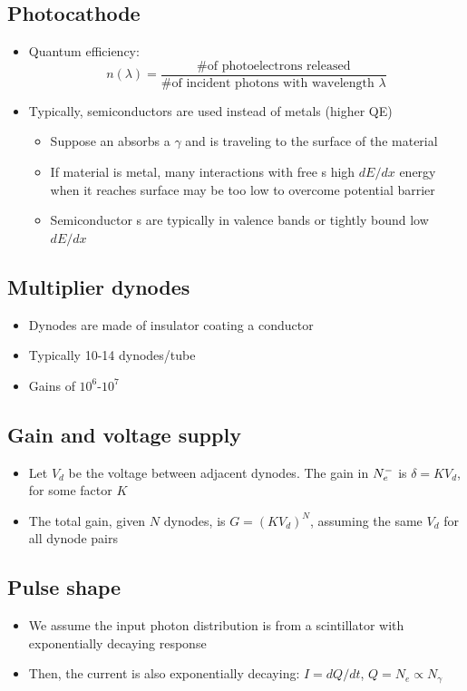 \subsection{Photocathode}
\begin{itemize}
  \item Quantum efficiency:
  \begin{equation}
    n(\lambda) = \frac{\text{\# of photoelectrons released}}{\text{\# of incident photons with wavelength $\lambda$}}
  \end{equation}
  \item Typically, semiconductors are used instead of metals (higher QE)
  \begin{itemize}
    \item Suppose an \el absorbs a $\gamma$ and is traveling to the surface of the material
    \item If material is metal, many interactions with free \el s \thus high $dE/dx$ \thus energy when it reaches surface may be too low to overcome potential barrier
    \item Semiconductor \el s are typically in valence bands or tightly bound \thus low $dE/dx$
  \end{itemize}
\end{itemize}

\subsection{Multiplier dynodes}
\begin{itemize}
  \item Dynodes are made of insulator coating a conductor
  \item Typically 10-14 dynodes/tube
  \item Gains of $10^6$-$10^7$
\end{itemize}

\subsection{Gain and voltage supply}
\begin{itemize}
  \item Let $V_d$ be the voltage between adjacent dynodes. The gain in $N_e^{-}$ is $\delta = K V_d$, for some factor $K$
  \item The total gain, given $N$ dynodes, is $G = (KV_d)^N$, assuming the same $V_d$ for all dynode pairs
\end{itemize}

\subsection{Pulse shape}
\begin{itemize}
  \item We assume the input photon distribution is from a scintillator with exponentially decaying response
  \item Then, the current is also exponentially decaying: $I = dQ/dt$, $Q = N_e\propto N_\gamma$
\end{itemize}

